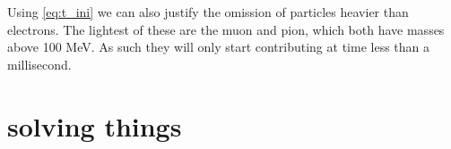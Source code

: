 Using \eqref{eq:t_ini} we can also justify the omission of particles heavier than electrons. The lightest of these are the muon and pion, which both have masses above 100 MeV. As such they will only start contributing at time less than a millisecond. 



\section{solving things}
